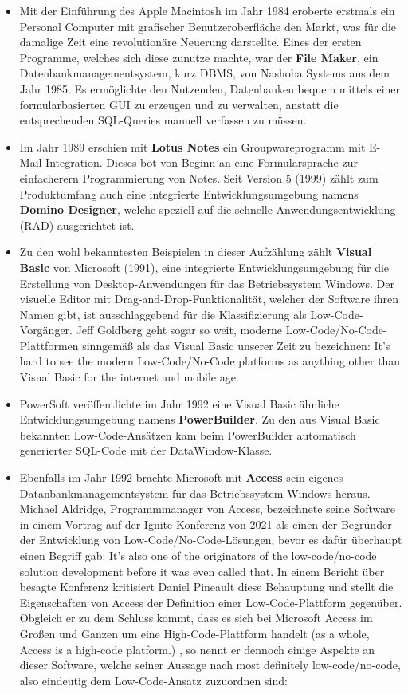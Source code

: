 \documentclass[acmtog, language=ngerman]{acmart}
\begin{document}
\begin{itemize}
    \item Mit der Einführung des Apple Macintosh im Jahr 1984 eroberte erstmals ein Personal Computer mit grafischer Benutzeroberfläche den Markt, was für die damalige Zeit eine revolutionäre Neuerung darstellte. Eines der ersten Programme, welches sich diese zunutze machte, war der \textbf{File Maker}, ein Datenbankmanagementsystem, kurz DBMS, von Nashoba Systems aus dem Jahr 1985. Es ermöglichte den Nutzenden, Datenbanken bequem mittels einer formularbasierten GUI zu erzeugen und zu verwalten, anstatt die entsprechenden SQL-Queries manuell verfassen zu müssen. \cite{filemaker_history}
    \item Im Jahr 1989 erschien mit \textbf{Lotus Notes} ein Groupwareprogramm mit E-Mail-Integration. Dieses bot von Beginn an eine Formularsprache zur einfacherern Programmierung von Notes. Seit Version 5 (1999) zählt zum Produktumfang auch eine integrierte Entwicklungsumgebung namens \textbf{Domino Designer}, welche speziell auf die schnelle Anwendungsentwicklung (RAD) ausgerichtet ist. \cite{history_of_notes_and_domino}
    \item Zu den wohl bekanntesten Beispielen in dieser Aufzählung zählt \textbf{Visual Basic} von Microsoft (1991), eine integrierte Entwicklungsumgebung für die Erstellung von Desktop-Anwendungen für das Betriebssystem Windows. Der visuelle Editor mit Drag-and-Drop-Funktionalität, welcher der Software ihren Namen gibt, ist  ausschlaggebend für die Klassifizierung als Low-Code-Vorgänger. Jeff Goldberg geht sogar so weit, moderne Low-Code/No-Code-Plattformen sinngemäß als das Visual Basic unserer Zeit zu bezeichnen: \glqq It’s hard to see the modern Low-Code/No-Code platforms as anything other than Visual Basic for the internet and mobile age\grqq. \cite{goldberg_visual_basic}
    \item PowerSoft veröffentlichte im Jahr 1992 eine Visual Basic ähnliche Entwicklungsumgebung namens \textbf{PowerBuilder}. Zu den aus Visual Basic bekannten Low-Code-Ansätzen kam beim PowerBuilder automatisch generierter SQL-Code mit der DataWindow-Klasse.
    \item Ebenfalls im Jahr 1992 brachte Microsoft mit \textbf{Access} sein eigenes Datanbankmanagementsystem für das Betriebssystem Windows heraus. Michael Aldridge, Programmmanager von Access, bezeichnete seine Software in einem Vortrag auf der Ignite-Konferenz von 2021 als einen der Begründer der Entwicklung von Low-Code/No-Code-Lösungen, bevor es dafür überhaupt einen Begriff gab: \glqq It's also one of the originators of the low-code/no-code solution development before it was even called that.\grqq \cite{aldridge} In einem Bericht über besagte Konferenz kritisiert Daniel Pineault diese Behauptung und stellt die Eigenschaften von Access der Definition einer Low-Code-Plattform gegenüber. Obgleich er zu dem Schluss kommt, dass es sich bei Microsoft Access im Großen und Ganzen um eine High-Code-Plattform handelt (\glqq [...] as a whole, Access is a high-code platform.\grqq) \cite{pineault}, so nennt er dennoch einige Aspekte an dieser Software, welche seiner Aussage nach \glqq most definitely low-code/no-code\grqq, also eindeutig dem Low-Code-Ansatz zuzuordnen sind:

\end{itemize}
\end{document}
